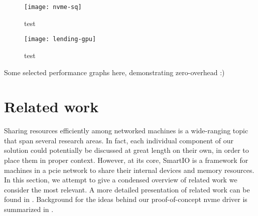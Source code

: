 \begin{figure}
    \centering
    \texttt{[image: nvme-sq]}
    \caption{test}
\end{figure}

\begin{figure}
    \centering
    \texttt{[image: lending-gpu]}
    \caption{test}
\end{figure}
Some selected performance graphs here, demonstrating zero-overhead :)



\section{Related work}\label{sec:rw}
Sharing resources efficiently among networked machines is a wide-ranging topic that span several research areas.
%
In fact, each individual component of our solution could potentially be discussed at great length on their own, in order to place them in proper context.
%
However, at its core, SmartIO is a framework for machines in a \gls{pcie} network to share their internal devices and memory resources.
%
In this section, we attempt to give a condensed overview of related work we consider the most relevant.
%
A more detailed presentation of related work can be found in .
%
Background for the ideas behind our proof-of-concept \gls{nvme} driver is summarized in .


